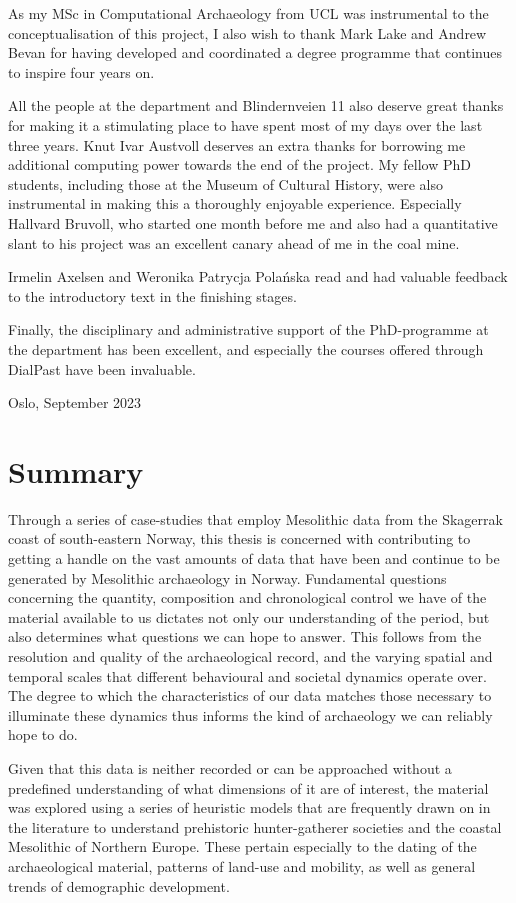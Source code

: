 As my MSc in Computational Archaeology from UCL was instrumental to the conceptualisation of this project, I also wish to thank Mark Lake and Andrew Bevan for having developed and coordinated a degree programme that continues to inspire four years on.

All the people at the department and Blindernveien 11 also deserve great thanks for making it a stimulating place to have spent most of my days over the last three years. Knut Ivar Austvoll deserves an extra thanks for borrowing me additional computing power towards the end of the project. My fellow PhD students, including those at the Museum of Cultural History, were also instrumental in making this a thoroughly enjoyable experience. Especially Hallvard Bruvoll, who started one month before me and also had a quantitative slant to his project was an excellent canary ahead of me in the coal mine.

Irmelin Axelsen and Weronika Patrycja Polańska read and had valuable feedback to the introductory text in the finishing stages.

Finally, the disciplinary and administrative support of the PhD-programme at the department has been excellent, and especially the courses offered through DialPast have been invaluable.

\bigskip
\noindent
Oslo, September 2023
\newpage

\section*{Summary}
Through a series of case-studies that employ Mesolithic data from the Skagerrak coast of south-eastern Norway, this thesis is concerned with contributing to getting a handle on the vast amounts of data that have been and continue to be generated by Mesolithic archaeology in Norway. Fundamental questions concerning the quantity, composition and chronological control we have of the material available to us dictates not only our understanding of the period, but also determines what questions we can hope to answer. This follows from the resolution and quality of the archaeological record, and the varying spatial and temporal scales that different behavioural and societal dynamics operate over. The degree to which the characteristics of our data matches those necessary to illuminate these dynamics thus informs the kind of archaeology we can reliably hope to do.   

Given that this data is neither recorded or can be approached without a predefined understanding of what dimensions of it are of interest, the material was explored using a series of heuristic models that are frequently drawn on in the literature to understand prehistoric hunter-gatherer societies and the coastal Mesolithic of Northern Europe. These pertain especially to the dating of the archaeological material, patterns of land-use and mobility, as well as general trends of demographic development. 

